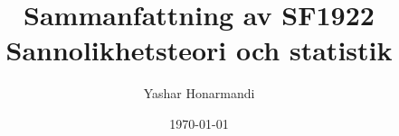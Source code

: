 \documentclass[a4paper, 11pt]{article}
\title{Sammanfattning av SF1922 Sannolikhetsteori och statistik}
\author{Yashar Honarmandi}
\date{\today}
\begin{document}
\maketitle

\begin{abstract}
	
\end{abstract}

\thispagestyle{empty}

\newpage

\tableofcontents

\newpage















\end{document}
